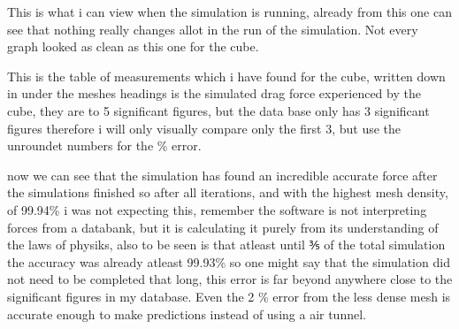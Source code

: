 \documentclass[12pt,a4paper]{article}
\begin{document}
This is what i can view when the simulation is running, already from this one can see that nothing really changes allot in the run of the simulation. Not every graph looked as clean as this one for the cube.

\begin{table}[H]
\centering
\caption{Full data collected for the cube simulation}
\label{tab:cube_results}
\end{table}

This is the table of measurements which i have found for the cube, written down in under the meshes headings is the simulated drag force experienced by the cube, they are to 5 significant figures, but the data base only has 3 significant figures therefore i will only visually compare only the first 3, but use the unroundet numbers for the \% error.

now we can see that the simulation has found an incredible accurate force after the simulations finished so after all iterations, and with the highest mesh density, of 99.94\% i was not expecting this, remember the software is not interpreting forces from a databank, but it is calculating it purely from its understanding of the laws of physiks, also to be seen is that atleast until ⅗ of the total simulation the accuracy was already atleast 99.93\% so one might say that the simulation did not need to be completed that long, this error is far beyond anywhere close to the significant figures in my database. Even the 2 \% error from the less dense mesh is accurate enough to make predictions instead of using a air tunnel. 
\end{document}
